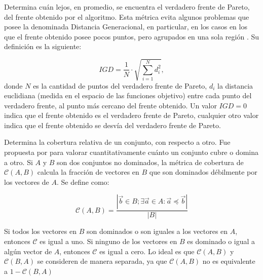       \begin{definicion} 
      Determina cu\'an lejos, en promedio, se encuentra el verdadero frente de Pareto, del frente obtenido por el algoritmo.
      Esta m\'etrica evita algunos problemas que posee la denominada Distancia Generacional, en particular, en los casos en 
      los que el frente obtenido posee pocos puntos, pero agrupados en una sola regi\'on \cite{Veldhuizen98}. 
      Su definici\'on es la siguiente:

      \[
	IGD = \frac{1}{N} \cdot \sqrt{\sum^{N}_{i=1}{d^2_i}},
      \]
      {\setlength{\parindent}{0pt}
      donde $N$ es la cantidad de puntos del verdadero frente de Pareto, $d_i$ la distancia euclidiana (medida en el espacio 
      de las funciones objetivo) entre cada punto del verdadero frente, al punto m\'as cercano del frente obtenido. Un valor 
      $IGD = 0$ indica que el frente obtenido es el verdadero frente de Pareto, cualquier otro valor indica que el frente obtenido 
      se desv\'ia del verdadero frente de Pareto.
      }
      \end{definicion}
  
      \begin{definicion}
	  Determina la cobertura relativa de un conjunto, con respecto a otro. Fue propuesta por \cite{Zitzler2000} para 
	  valorar cuantitativamente cu\'anto un conjunto cubre o domina a otro. Si $A$ y $B$ son dos conjuntos no dominados,
	  la m\'etrica de cobertura de $\mathcal{C}(A,B)$ calcula la fracci\'on de vectores en $B$ que son dominados 
	  d\'ebilmente por los vectores de $A$. Se define como:

	  \[
	      \mathcal{C}\left(A, B \right) = \frac{|\vec{b} \in B; \exists \vec{a} \in A: \vec{a}\preceq \vec{b}|}{|B|}
	  \]
	  
	  Si todos los vectores en $B$ son dominados o son iguales a los vectores en $A$, entonces $\mathcal{C}$ es igual a uno. 
	  Si ninguno de los vectores en $B$ es dominado o igual a alg\'un vector de $A$, entonces $\mathcal{C}$ es igual a cero. 
	  Lo ideal es que $\mathcal{C} \left(A, B\right)$  y $\mathcal{C} \left(B, A \right)$ se consideren de manera separada, 
	  ya que $\mathcal{C}\left(A, B\right)$ no es equivalente a $1- \mathcal{C}\left(B, A\right)$
      \end{definicion}
      
